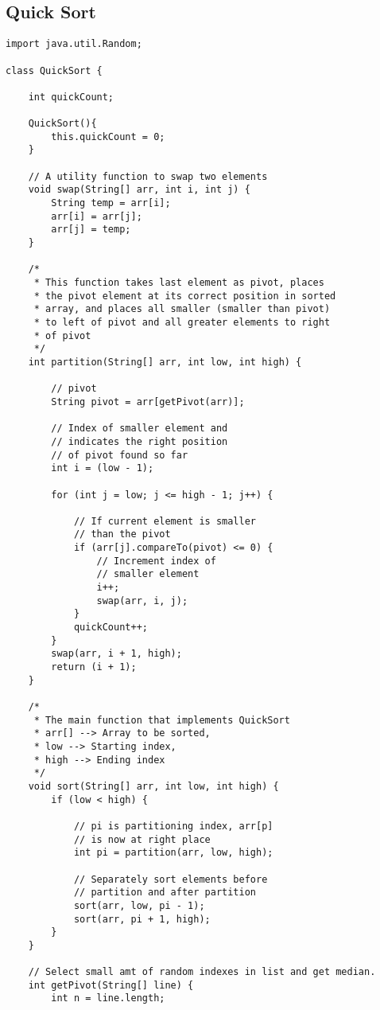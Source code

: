 \documentclass[letterpaper, 10pt,DIV=13]{scrartcl}
\numberwithin{equation}{section} %
\numberwithin{figure}{section} %
\numberwithin{table}{section} %
\begin{document}
\subsection{Quick Sort}
\begin{lstlisting}[frame=single, ] 
import java.util.Random; 

class QuickSort {

    int quickCount;

    QuickSort(){
        this.quickCount = 0;
    }

    // A utility function to swap two elements
    void swap(String[] arr, int i, int j) {
        String temp = arr[i];
        arr[i] = arr[j];
        arr[j] = temp;
    }

    /*
     * This function takes last element as pivot, places
     * the pivot element at its correct position in sorted
     * array, and places all smaller (smaller than pivot)
     * to left of pivot and all greater elements to right
     * of pivot
     */
    int partition(String[] arr, int low, int high) {

        // pivot
        String pivot = arr[getPivot(arr)];

        // Index of smaller element and
        // indicates the right position
        // of pivot found so far
        int i = (low - 1);

        for (int j = low; j <= high - 1; j++) {

            // If current element is smaller
            // than the pivot
            if (arr[j].compareTo(pivot) <= 0) {
                // Increment index of
                // smaller element
                i++;
                swap(arr, i, j);
            }
            quickCount++;
        }
        swap(arr, i + 1, high);
        return (i + 1);
    }

    /*
     * The main function that implements QuickSort
     * arr[] --> Array to be sorted,
     * low --> Starting index,
     * high --> Ending index
     */
    void sort(String[] arr, int low, int high) {
        if (low < high) {

            // pi is partitioning index, arr[p]
            // is now at right place
            int pi = partition(arr, low, high);

            // Separately sort elements before
            // partition and after partition
            sort(arr, low, pi - 1);
            sort(arr, pi + 1, high);
        }
    }

    // Select small amt of random indexes in list and get median.
    int getPivot(String[] line) {
        int n = line.length;


\end{lstlisting}
\end{document}
